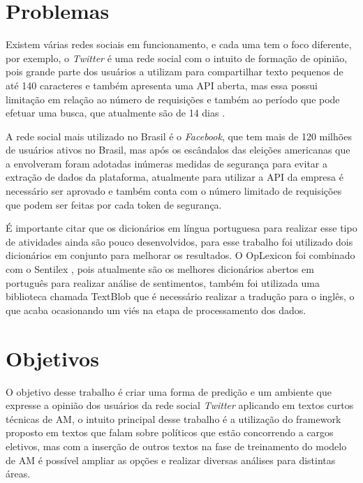 %

\section{Problemas}

Existem várias redes sociais em funcionamento, e cada uma tem o foco diferente, por exemplo, o \textit{Twitter} é uma rede social com o intuito de formação de opinião, pois
grande parte dos usuários a utilizam para compartilhar texto pequenos de até 140 caracteres e também apresenta uma \acrshort{API} aberta, mas essa possui limitação 
em relação ao número de requisições e também ao período que pode efetuar uma busca, que atualmente são de 14 dias \cite{Twitter}.

A rede social mais utilizado no Brasil é o \textit{Facebook}, que tem mais de 120 milhões de usuários ativos no Brasil\cite{EBC}, mas após os escândalos das eleições americanas que a envolveram \cite{face}
foram adotadas inúmeras medidas de segurança para evitar a extração de dados da plataforma, atualmente para utilizar a \acrshort{API} da empresa é necessário ser aprovado e também conta com o número limitado
de requisições que podem ser feitas por cada token de segurança.

É importante citar que os dicionários em língua portuguesa para realizar esse tipo de atividades ainda são pouco desenvolvidos, para esse trabalho foi utilizado dois dicionários em conjunto para melhorar 
os resultados. O OpLexicon \cite{souza} foi combinado com o Sentilex \cite{Neuenschwander}, pois atualmente são os melhores dicionários abertos em português para realizar análise de sentimentos, também foi utilizada
uma biblioteca chamada TextBlob \cite{textblob} que é necessário  realizar a tradução para o inglês, o que acaba ocasionando um viés na etapa de processamento dos dados.
\section{Objetivos}

O objetivo desse trabalho é criar uma forma de predição e um ambiente que expresse a opinião dos usuários da rede social \textit{Twitter} aplicando em textos curtos técnicas de \acrshort{AM},
o intuito principal desse trabalho é a utilização do framework proposto em textos que falam sobre políticos que estão concorrendo a cargos eletivos, mas com a inserção de outros textos na fase de treinamento do modelo de \acrshort{AM} é possível
ampliar as opções e realizar diversas análises para distintas áreas.


